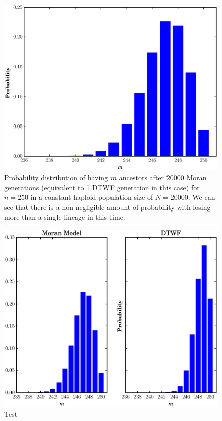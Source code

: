 \documentclass[10pt]{article}
\begin{document}
\begin{center}
\begin{figure}[!h]
	\includegraphics[scale=0.85]{../plots/figure1}
	\caption{Probability distribution of having $m$ ancestors after $20000$ Moran generations (equivalent to 1 DTWF generation in this case) for $n = 250$ in a constant haploid population size of $N = 20000$. We can see that there is a non-negligible amount of probability with losing more than a single lineage in this time.}
\end{figure}
\end{center}


\begin{center}
	\begin{figure}[!h]
		\includegraphics[scale=0.85]{../plots/figure2}
		\caption{Test}
	\end{figure}
\end{center}
\end{document}
